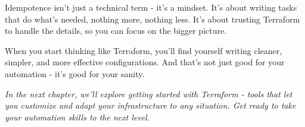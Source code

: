 Idempotence isn't just a technical term - it's a mindset. It's about writing tasks that do what's needed, nothing more, nothing less. It's about trusting Terraform to handle the details, so you can focus on the bigger picture.

When you start thinking like Terraform, you'll find yourself writing cleaner, simpler, and more effective configurations. And that's not just good for your automation - it's good for your sanity.


\vspace{1em}
\textit{In the next chapter, we'll explore getting started with Terraform - tools that let you customize and adapt your infrastructure to any situation. Get ready to take your automation skills to the next level.}
